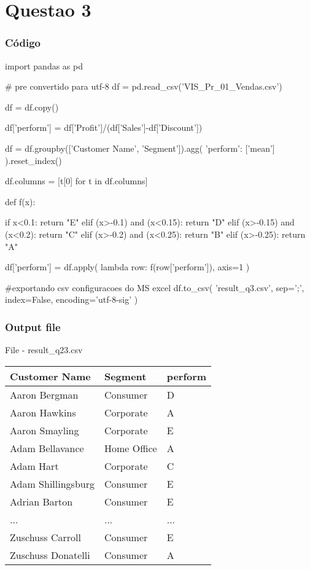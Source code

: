 \chapter{Questao 3}

\subsection*{Código}

\begin{python}
import pandas as pd

# pre convertido para utf-8
df = pd.read_csv('VIS_Pr_01_Vendas.csv')

df = df.copy()

df['perform']  = df['Profit']/(df['Sales']-df['Discount'])

df = df.groupby(['Customer Name', 'Segment']).agg(
    {'perform': ['mean']}
).reset_index()

df.columns = [t[0] for t in df.columns]


def f(x):
    
    if x<0.1:
        return "E"
    elif (x>-0.1) and (x<0.15):
        return "D"
    elif (x>-0.15) and (x<0.2):
        return "C"
    elif (x>-0.2) and (x<0.25):
        return "B"
    elif (x>-0.25):
        return "A"


df['perform'] = df.apply(
    lambda row: f(row['perform']),
    axis=1
)


#exportando csv configuracoes do MS excel
df.to_csv(
    'result_q3.csv',
    sep=';',
    index=False,
    encoding='utf-8-sig'
)
    
\end{python}


\subsection*{Output file}


\begin{quadro}[htb]
	\caption{File - result\_q23.csv}
    \begin{tabular}{|l|l|l|}
		\hline
        Customer Name & Segment & perform \\ \hline
        Aaron Bergman & Consumer & D \\ \hline
        Aaron Hawkins & Corporate & A \\ \hline
        Aaron Smayling & Corporate & E \\ \hline
        Adam Bellavance & Home Office & A \\ \hline
        Adam Hart & Corporate & C \\ \hline
        Adam Shillingsburg & Consumer & E \\ \hline
        Adrian Barton & Consumer & E \\ \hline
        ... & ... & ... \\ \hline
        Zuschuss Carroll & Consumer & E \\ \hline
        Zuschuss Donatelli & Consumer & A \\ \hline
	\end{tabular}
	\end{quadro}

